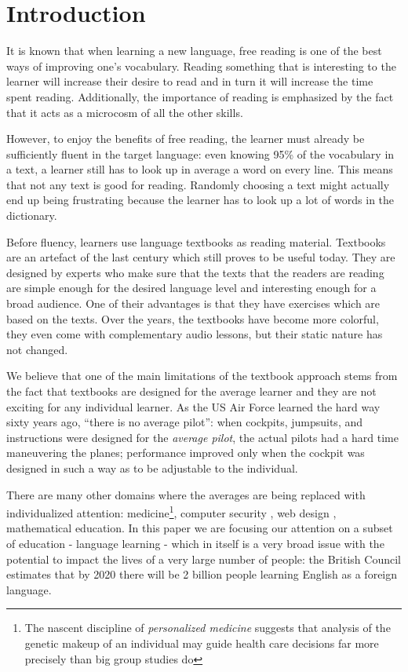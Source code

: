 
\section{Introduction}
It is known that when learning a new language, free reading is one of the best ways of improving one's vocabulary. Reading something that is interesting to the learner will increase their desire to read and in turn it will increase the time spent reading. Additionally, the importance of reading is emphasized by the fact that it acts as a microcosm of all the other skills. \cite{mccarthy1999-microcosm} 

However, to enjoy the benefits of free reading, the learner must already be sufficiently fluent in the target language: even knowing 95\% of the vocabulary in a text, a learner still has to look up in average a word on every line. \cite{Hirsh92-vocab-size} This means that not any text is good for reading. Randomly choosing a text might actually end up being frustrating because the learner has to look up a lot of words in the dictionary.

Before fluency, learners use language textbooks as reading material. Textbooks are an artefact of the last century which still proves to be useful today. They are designed by experts who make sure that the texts that the readers are reading are simple enough for the desired language level and interesting enough for a broad audience. One of their advantages is that they have exercises which are based on the texts. Over the years, the textbooks have become more colorful, they even come with complementary audio lessons, but their static nature has not changed.

We believe that one of the main limitations of the textbook approach stems from the fact that textbooks are designed for the average learner and they are not exciting for any individual learner. As the US Air Force learned the hard way sixty years ago, ``there is no average pilot'': when cockpits, jumpsuits, and instructions were designed for the {\em average pilot}, the actual pilots had a hard time maneuvering the planes; performance improved only when the cockpit was designed in such a way as to be adjustable to the individual. 

There are many other domains where the averages are being replaced with individualized attention: medicine\footnote{The nascent discipline of {\em personalized medicine} suggests that analysis of the genetic makeup of an individual may guide health care decisions far more precisely than big group studies do}, computer security %
, web design\cite{Reinecke13-CulturalAdaptation} , mathematical education\cite{Polozov15-AdaptableMath}. In this paper we are focusing our attention on a subset of education - language learning - which in itself is a very broad issue with the potential to impact the lives of a very large number of people: the British Council estimates that by 2020 there will be 2 billion people learning English as a foreign language. 

